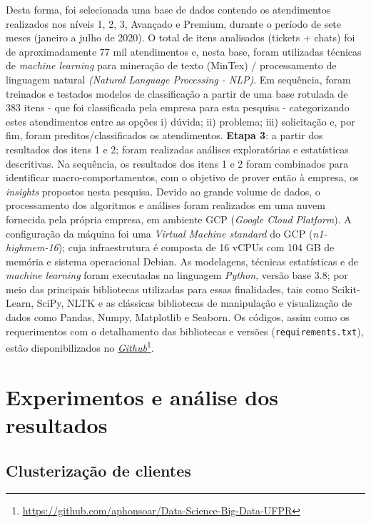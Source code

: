 \documentclass[twocolumn]{rbef}
\newcommand{\1}{\mathbbm{1}}
\begin{document}
Desta forma, foi selecionada uma base de dados contendo os atendimentos realizados nos níveis 1, 2, 3, Avançado e Premium, durante o período de sete meses (janeiro a julho de 2020). O total de itens analisados (tickets + chats) foi de aproximadamente 77 mil atendimentos e, nesta base, foram utilizadas técnicas de \emph{machine learning} para mineração de texto (MinTex) / processamento de linguagem natural \emph{(Natural Language Processing - NLP)}. Em sequência, foram treinados e testados modelos de classificação a partir de uma base rotulada de 383 itens - que foi classificada pela empresa para esta pesquisa - categorizando estes atendimentos entre as opções i) dúvida; ii) problema; iii) solicitação e, por fim, foram preditos/classificados os atendimentos.
\newline\textbf{Etapa 3}: a partir dos resultados dos itens 1 e 2; foram realizadas análises exploratórias e estatísticas descritivas. Na sequência, os resultados dos itens 1 e 2 foram combinados para identificar macro-comportamentos, com o objetivo de prover então à empresa, os \emph{insights} propostos nesta pesquisa.
Devido ao grande volume de dados, o processamento dos algoritmos e análises foram realizados em uma nuvem fornecida pela própria empresa, em ambiente GCP (\emph{Google Cloud Platform}). A configuração da máquina foi uma \emph{Virtual Machine standard} do GCP (\emph{n1-highmem-16}); cuja infraestrutura é composta de 16 vCPUs com 104 GB de memória e sistema operacional Debian.
As modelagens, técnicas estatísticas e de \emph{machine learning} foram executadas na linguagem \emph{Python}, versão base 3.8; por meio das principais bibliotecas utilizadas para essas finalidades, tais como Scikit-Learn, SciPy, NLTK e as clássicas bibliotecas de manipulação e visualização de dados como Pandas, Numpy, Matplotlib e Seaborn.
Os códigos, assim como os requerimentos com o detalhamento das bibliotecas e versões (\texttt{requirements.txt}), estão disponibilizados no \href{https://github.com/aphonsoar/Data-Science-Big-Data-UFPR}{\emph{Github}}\footnote{\url{https://github.com/aphonsoar/Data-Science-Big-Data-UFPR}}.


\section{Experimentos e análise dos resultados} \label{Sessao4}
\subsection{Clusterização de clientes} \label{Sessao4.1}
\end{document}
